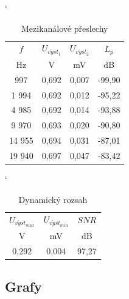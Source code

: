 \documentclass[a4paper, czech]{article}
\begin{document}
\begin{minipage}{0.48\textwidth}
    \begin{table}[H]
        \catcode`
        \centering
        \caption{Mezikanálové přeslechy}
        \begin{tabular}{cccc}
            \toprule
            $f$      & $U_{v \acute{y} st_1}$ & $U_{v \acute{y} st_2}$ & $L_p$     \\
            \cmidrule(rl){1-1}
            \cmidrule(rl){2-2}
            \cmidrule(rl){3-3}
            \cmidrule(rl){4-4}
            Hz     & V      & mV     & dB     \\
            \midrule
            997    & 0,692  & 0,007  & -99,90 \\
            1 994  & 0,692  & 0,012  & -95,22 \\
            4 985  & 0,692  & 0,014  & -93,88 \\
            9 970  & 0,693  & 0,020  & -90,80 \\
            14 955 & 0,694  & 0,031  & -87,01 \\
            19 940 & 0,697  & 0,047  & -83,42 \\
            \bottomrule
        \end{tabular}
    \end{table}
\end{minipage}
\begin{minipage}{0.48\textwidth}
    \begin{table}[H]
        \catcode`
        \centering
        \caption{Dynamický rozsah}
        \begin{tabular}{ccc}
            \toprule
            $U_{v\acute{y}st_{max}}$ & $U_{v\acute{y}st_{min}}$ & $SNR$ \\
            \cmidrule(rl){1-1}
            \cmidrule(rl){2-2}
            \cmidrule(rl){3-3}
            V                        & mV                       & dB    \\
            \midrule
            0,292                    & 0,004                    & 97,27 \\
            \bottomrule
        \end{tabular}
    \end{table}
\end{minipage}

\subsection{Grafy}
\end{document}
